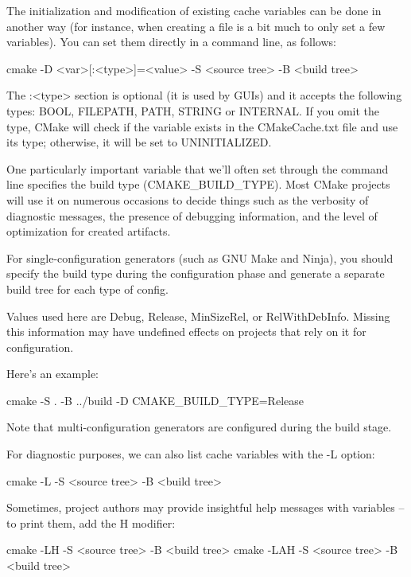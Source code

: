 The initialization and modification of existing cache variables can be done in another way (for instance, when creating a file is a bit much to only set a few variables). You can set them directly in a command line, as follows:

\begin{shell}
cmake -D <var>[:<type>]=<value> -S <source tree> -B <build tree>
\end{shell}

The :<type> section is optional (it is used by GUIs) and it accepts the following types: BOOL, FILEPATH, PATH, STRING or INTERNAL. If you omit the type, CMake will check if the variable exists in the CMakeCache.txt file and use its type; otherwise, it will be set to UNINITIALIZED.

One particularly important variable that we’ll often set through the command line specifies the build type (CMAKE\_BUILD\_TYPE). Most CMake projects will use it on numerous occasions to decide things such as the verbosity of diagnostic messages, the presence of debugging information, and the level of optimization for created artifacts.

For single-configuration generators (such as GNU Make and Ninja), you should specify the build type during the configuration phase and generate a separate build tree for each type of config.

Values used here are Debug, Release, MinSizeRel, or RelWithDebInfo. Missing this information may have undefined effects on projects that rely on it for configuration.

Here’s an example:

\begin{shell}
cmake -S . -B ../build -D CMAKE_BUILD_TYPE=Release
\end{shell}

Note that multi-configuration generators are configured during the build stage.

For diagnostic purposes, we can also list cache variables with the -L option:

\begin{shell}
cmake -L -S <source tree> -B <build tree>
\end{shell}

Sometimes, project authors may provide insightful help messages with variables – to print them, add the H modifier:

\begin{shell}
cmake -LH -S <source tree> -B <build tree>
cmake -LAH -S <source tree> -B <build tree>
\end{shell}

